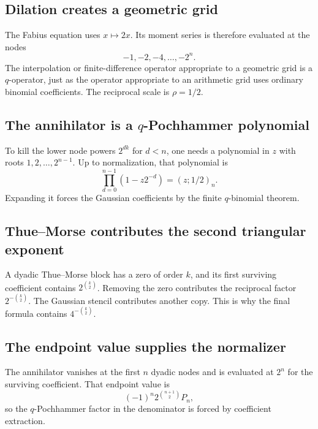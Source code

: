 \documentclass[11pt]{article}
\theoremstyle{definition}
\newcommand{\qpoch}[3]{\left(#1;#2\right)_{#3}}
\begin{document}
\subsection{Dilation creates a geometric grid}

The Fabius equation uses $x\mapsto2x$.  Its moment series is therefore evaluated at the nodes
\[
  -1,-2,-4,\ldots,-2^n.
\]
The interpolation or finite-difference operator appropriate to a geometric grid is a $q$-operator, just as the operator appropriate to an arithmetic grid uses ordinary binomial coefficients.  The reciprocal scale is $\rho=1/2$.

\subsection{The annihilator is a \texorpdfstring{$q$}{q}-Pochhammer polynomial}

To kill the lower node powers $2^{dk}$ for $d<n$, one needs a polynomial in $z$ with roots
$1,2,\ldots,2^{n-1}$.  Up to normalization, that polynomial is
\begin{equation}
  \prod_{d=0}^{n-1}(1-z2^{-d})=\qpoch{z}{1/2}{n}.
  \label{eq:annihilator-qpoch}
\end{equation}
Expanding it forces the Gaussian coefficients by the finite $q$-binomial theorem.

\subsection{Thue--Morse contributes the second triangular exponent}

A dyadic Thue--Morse block has a zero of order $k$, and its first surviving coefficient contains
$2^{\binom{k}{2}}$.  Removing the zero contributes the reciprocal factor
$2^{-\binom{k}{2}}$.  The Gaussian stencil contributes another copy.  This is why the final formula contains $4^{-\binom{k}{2}}$.

\subsection{The endpoint value supplies the normalizer}

The annihilator vanishes at the first $n$ dyadic nodes and is evaluated at $2^n$ for the surviving coefficient.  That endpoint value is
\begin{equation}
  (-1)^n2^{\binom{n+1}{2}}P_n,
  \label{eq:endpoint-normalizer-summary}
\end{equation}
so the $q$-Pochhammer factor in the denominator is forced by coefficient extraction.
\end{document}
